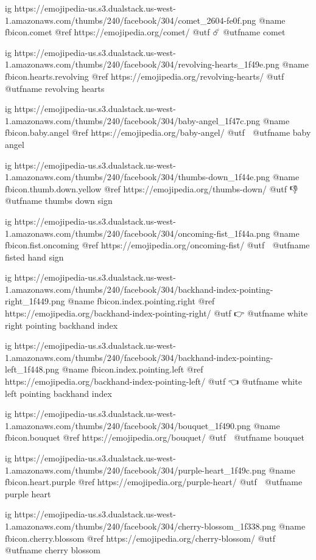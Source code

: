   ig https://emojipedia-us.s3.dualstack.us-west-1.amazonaws.com/thumbs/240/facebook/304/comet_2604-fe0f.png
  @name fbicon.comet
  @ref https://emojipedia.org/comet/
  @utf ☄️
  @utfname comet

  ig https://emojipedia-us.s3.dualstack.us-west-1.amazonaws.com/thumbs/240/facebook/304/revolving-hearts_1f49e.png
  @name fbicon.hearts.revolving
  @ref https://emojipedia.org/revolving-hearts/
  @utf 💞
  @utfname revolving hearts

  ig https://emojipedia-us.s3.dualstack.us-west-1.amazonaws.com/thumbs/240/facebook/304/baby-angel_1f47c.png
  @name fbicon.baby.angel
  @ref https://emojipedia.org/baby-angel/
  @utf 👼
  @utfname baby angel

  ig https://emojipedia-us.s3.dualstack.us-west-1.amazonaws.com/thumbs/240/facebook/304/thumbs-down_1f44e.png
  @name fbicon.thumb.down.yellow
  @ref https://emojipedia.org/thumbs-down/
  @utf 👎
  @utfname thumbs down sign

  ig https://emojipedia-us.s3.dualstack.us-west-1.amazonaws.com/thumbs/240/facebook/304/oncoming-fist_1f44a.png
  @name fbicon.fist.oncoming
  @ref https://emojipedia.org/oncoming-fist/
  @utf 👊
  @utfname fisted hand sign

  ig https://emojipedia-us.s3.dualstack.us-west-1.amazonaws.com/thumbs/240/facebook/304/backhand-index-pointing-right_1f449.png
  @name fbicon.index.pointing.right
  @ref https://emojipedia.org/backhand-index-pointing-right/
  @utf 👉
  @utfname white right pointing backhand index

  ig https://emojipedia-us.s3.dualstack.us-west-1.amazonaws.com/thumbs/240/facebook/304/backhand-index-pointing-left_1f448.png
  @name fbicon.index.pointing.left
  @ref https://emojipedia.org/backhand-index-pointing-left/
  @utf 👈
  @utfname white left pointing backhand index

  ig https://emojipedia-us.s3.dualstack.us-west-1.amazonaws.com/thumbs/240/facebook/304/bouquet_1f490.png
  @name fbicon.bouquet
  @ref https://emojipedia.org/bouquet/
  @utf 💐
  @utfname bouquet

  ig https://emojipedia-us.s3.dualstack.us-west-1.amazonaws.com/thumbs/240/facebook/304/purple-heart_1f49c.png
  @name fbicon.heart.purple
  @ref https://emojipedia.org/purple-heart/
  @utf 💜
  @utfname purple heart

  ig https://emojipedia-us.s3.dualstack.us-west-1.amazonaws.com/thumbs/240/facebook/304/cherry-blossom_1f338.png
  @name fbicon.cherry.blossom
  @ref https://emojipedia.org/cherry-blossom/
  @utf 🌸
  @utfname cherry blossom

